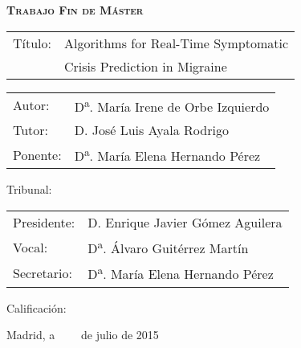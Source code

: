 


\begin{center}
\large
\textsc{\textbf{Trabajo Fin de Máster}}\\
\end{center}

\vspace*{3cm}

\begin{tabular}{p{3cm}l}
Título:&Algorithms for Real-Time Symptomatic\\
&Crisis Prediction in Migraine\\
\end{tabular}


\vspace*{0.5cm}

\begin{tabular}{p{3cm}l}
Autor:&D\textsuperscript{a}. María Irene de Orbe Izquierdo\\
Tutor:&D. José Luis Ayala Rodrigo\\
Ponente:&D\textsuperscript{a}. María Elena Hernando Pérez\\
\end{tabular}

\vspace*{2.5cm}
Tribunal:

\vspace*{0.5cm}
\begin{tabular}{p{3cm}l}
	Presidente:&D. Enrique Javier Gómez Aguilera\\
	Vocal:&D\textsuperscript{a}. Álvaro Guitérrez Martín\\
	Secretario:&D\textsuperscript{a}. María Elena Hernando Pérez\\
\end{tabular}


\vspace*{1.5cm}


Calificación:

\vspace*{2cm}

\begin{flushright}
Madrid, a \ \ \ \  de julio de 2015
\end{flushright}

\thispagestyle{empty}
